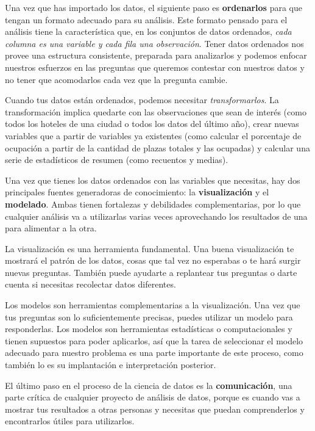 \documentclass[
  openany]{book}
\begin{document}
Una vez que has importado los datos, el siguiente paso es \textbf{ordenarlos} para que tengan un formato adecuado para su análisis.
Este formato pensado para el análisis tiene la característica que, en los conjuntos de datos ordenados, \emph{cada columna es una variable y cada fila una observación}.
Tener datos ordenados nos provee una estructura consistente, preparada para analizarlos y podemos enfocar nuestros esfuerzos en las preguntas que queremos contestar con nuestros datos y no tener que acomodarlos cada vez que la pregunta cambie.

Cuando tus datos están ordenados, podemos necesitar \emph{transformarlos}.
La transformación implica quedarte con las observaciones que sean de interés (como todos los hoteles de una ciudad o todos los datos del último año), crear nuevas variables que a partir de variables ya existentes (como calcular el porcentaje de ocupación a partir de la cantidad de plazas totales y las ocupadas) y calcular una serie de estadísticos de resumen (como recuentos y medias).

Una vez que tienes los datos ordenados con las variables que necesitas, hay dos principales fuentes generadoras de conocimiento: la \textbf{visualización} y el \textbf{modelado}.
Ambas tienen fortalezas y debilidades complementarias, por lo que cualquier análisis va a utilizarlas varias veces aprovechando los resultados de una para alimentar a la otra.

La visualización es una herramienta fundamental.
Una buena visualización te mostrará el patrón de los datos, cosas que tal vez no esperabas o te hará surgir nuevas preguntas.
También puede ayudarte a replantear tus preguntas o darte cuenta si necesitas recolectar datos diferentes.

Los modelos son herramientas complementarias a la visualización.
Una vez que tus preguntas son lo suficientemente precisas, puedes utilizar un modelo para responderlas.
Los modelos son herramientas estadísticas o computacionales y tienen supuestos para poder aplicarlos, así que la tarea de seleccionar el modelo adecuado para nuestro problema es una parte importante de este proceso, como también lo es su implantación e interpretación posterior.

El último paso en el proceso de la ciencia de datos es la \textbf{comunicación}, una parte crítica de cualquier proyecto de análisis de datos, porque es cuando vas a mostrar tus resultados a otras personas y necesitas que puedan comprenderlos y encontrarlos útiles para utilizarlos.
\end{document}
